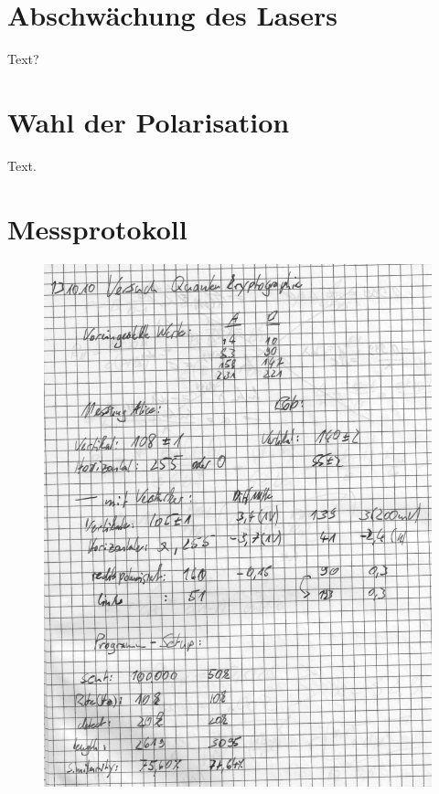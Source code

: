 \appendix
\section{Abschwächung des Lasers}
\label{sec:laser}
Text?

\section{Wahl der Polarisation}
\label{sec:zirkular}
Text.

\onecolumn
\section{Messprotokoll}
\label{sec:protokoll}
\begin{figure}[!ht]
        \centering
        \includegraphics[page=1,width=.88\textwidth,keepaspectratio]{../data/messprotokoll}
        \label{fig:protokoll}
\end{figure}